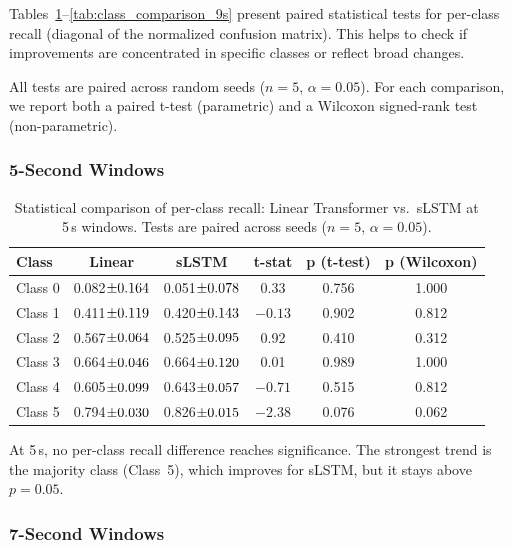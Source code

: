 Tables~\ref{tab:class_comparison_5s}--\ref{tab:class_comparison_9s} present paired statistical tests for per-class recall (diagonal of the normalized confusion matrix). This helps to check if improvements are concentrated in specific classes or reflect broad changes.

All tests are paired across random seeds ($n=5$, $\alpha=0.05$). For each comparison, we report both a paired t-test (parametric) and a Wilcoxon signed-rank test (non-parametric).

\subsubsection{5-Second Windows}

\begin{table}[htbp]
\centering
\caption{Statistical comparison of per-class recall: Linear Transformer vs.\ \ac{sLSTM} at 5\,s windows. Tests are paired across seeds ($n=5$, $\alpha=0.05$).}
\label{tab:class_comparison_5s}
\small
\setlength{\tabcolsep}{3pt}
\begin{tabular}{l|c|c|c|c|c}
\hline
		\textbf{Class} & \textbf{Linear} & \textbf{\ac{sLSTM}} & \textbf{t-stat} & \textbf{p (t-test)} & \textbf{p (Wilcoxon)} \\
\hline
Class 0 & 0.082$\pm{\scriptsize 0.164}$ & 0.051$\pm{\scriptsize 0.078}$ & 0.33 & 0.756 & 1.000 \\
Class 1 & 0.411$\pm{\scriptsize 0.119}$ & 0.420$\pm{\scriptsize 0.143}$ & $-0.13$ & 0.902 & 0.812 \\
Class 2 & 0.567$\pm{\scriptsize 0.064}$ & 0.525$\pm{\scriptsize 0.095}$ & 0.92 & 0.410 & 0.312 \\
Class 3 & 0.664$\pm{\scriptsize 0.046}$ & 0.664$\pm{\scriptsize 0.120}$ & 0.01 & 0.989 & 1.000 \\
Class 4 & 0.605$\pm{\scriptsize 0.099}$ & 0.643$\pm{\scriptsize 0.057}$ & $-0.71$ & 0.515 & 0.812 \\
Class 5 & 0.794$\pm{\scriptsize 0.030}$ & 0.826$\pm{\scriptsize 0.015}$ & $-2.38$ & 0.076 & 0.062 \\
\hline
\end{tabular}
\setlength{\tabcolsep}{6pt}
\end{table}

At 5\,s, no per-class recall difference reaches significance. The strongest trend is the majority class (Class~5), which improves for \ac{sLSTM}, but it stays above $p=0.05$.

\subsubsection{7-Second Windows}

